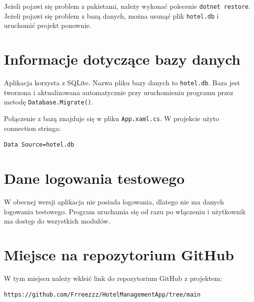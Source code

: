 Jeżeli pojawi się problem z pakietami, należy wykonać polecenie \texttt{dotnet restore}. Jeżeli pojawi się problem z bazą danych, można usunąć plik \texttt{hotel.db} i uruchomić projekt ponownie.

\section{Informacje dotyczące bazy danych}

Aplikacja korzysta z SQLite. Nazwa pliku bazy danych to \texttt{hotel.db}. Baza jest tworzona i aktualizowana automatycznie przy uruchomieniu programu przez metodę \texttt{Database.Migrate()}.

Połączenie z bazą znajduje się w pliku \texttt{App.xaml.cs}. W projekcie użyto connection stringa:

\begin{lstlisting}[style=textStyle,caption={Connection string SQLite},label={lst:connectionstring}]
Data Source=hotel.db
\end{lstlisting}

\section{Dane logowania testowego}

W obecnej wersji aplikacja nie posiada logowania, dlatego nie ma danych logowania testowego. Program uruchamia się od razu po włączeniu i użytkownik ma dostęp do wszystkich modułów.

\section{Miejsce na repozytorium GitHub}

W tym miejscu należy wkleić link do repozytorium GitHub z projektem:

\begin{lstlisting}[style=textStyle,caption={Miejsce na link do repozytorium GitHub},label={lst:github}]
https://github.com/Frreezzz/HotelManagementApp/tree/main
\end{lstlisting}
